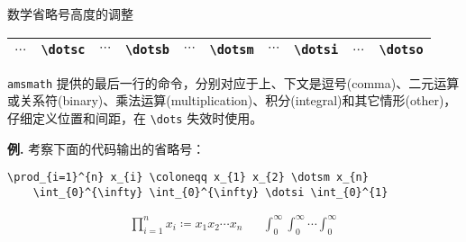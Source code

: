 \documentclass[mathserif]{beamer}
\newcommand{\codegreen}[1]{\textcolor{codegreen}{#1}}
\newenvironment{instance}{\zihao{-5}\textbf{\songti \codegreen{例.}}}{\hfill\par}
\begin{document}
\begin{frame}[fragile]{数学省略号}{高度的调整}
\begin{table}[H]
\centering
\begin{tabular}{cc|cc|cc|cc|cc}
	\toprule
	$\dotsc$ & \lstinline'\dotsc' & $\dotsb$ & \lstinline'\dotsb' & $\dotsm$ & \lstinline'\dotsm' & $\dotsi$ & \lstinline'\dotsi' & $\dotso$ & \lstinline'\dotso' \\
	\bottomrule
\end{tabular}
\end{table}
\verb'amsmath' 提供的最后一行的命令，分别对应于上、下文是逗号(comma)、二元运算或关系符(binary)、乘法运算(multiplication)、积分(integral)和其它情形(other)，仔细定义位置和间距，在 \lstinline'\dots' 失效时使用。

\begin{instance}
	考察下面的代码输出的省略号：
\begin{lstlisting}[numbers=none]
	\prod_{i=1}^{n} x_{i} \coloneqq x_{1} x_{2} \dotsm x_{n}
	\int_{0}^{\infty} \int_{0}^{\infty} \dotsi \int_{0}^{1}
\end{lstlisting}
\begin{align*}
	\prod_{i=1}^{n} x_{i} \coloneqq x_{1} x_{2} \dotsm x_{n} &&
	\int_{0}^{\infty} \int_{0}^{\infty} \dotsi \int_{0}^{\infty}
\end{align*}
\end{instance}
\end{frame}
\end{document}
